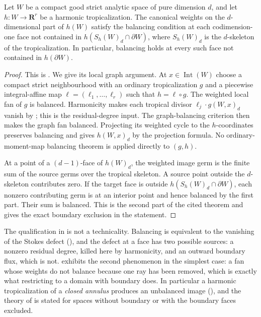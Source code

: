 \begin{theorem}\label{thm:harmonic-balancing}
Let $W$ be a compact good strict analytic space of pure dimension $d$,
and let $h:W\to\mathbf R^r$ be a harmonic tropicalization.  The canonical
weights on the $d$-dimensional part of $h(W)$ satisfy the balancing
condition at each codimension-one face not contained in
$h(S_h(W)_d\cap\partial W)$, where $S_h(W)_d$ is the $d$-skeleton of
the tropicalization.  In particular, balancing holds at every such face not
contained in $h(\partial W)$.
\end{theorem}
\begin{proof}
This is \cite[Theorem~9.7]{GJR26}.  We give its local graph argument.
At $x\in\operatorname{Int}(W)$ choose a compact strict neighbourhood
with an ordinary tropicalization $g$ and a piecewise integral-affine map
$\ell=(\ell_1,\ldots,\ell_r)$ such that $h=\ell\circ g$.
The weighted local fan of $g$ is balanced.  Harmonicity makes each
tropical divisor $\ell_j\cdot g(W,x)_d$ vanish by
\cite[Proposition~9.6]{GJR26}; this is the residual-degree input.
The graph-balancing criterion \cite[Corollary~9.4]{GJR26} then makes the
graph fan balanced.  Projecting its weighted cycle to the $h$-coordinates
preserves balancing and gives $h(W,x)_d$ by the projection formula.
No ordinary-moment-map balancing theorem is applied directly to $(g,h)$.

At a point of a $(d-1)$-face of $h(W)_d$, the weighted image germ is the
finite sum of the source germs over the tropical skeleton.  A source point
outside the $d$-skeleton contributes zero.  If the target face is outside
$h(S_h(W)_d\cap\partial W)$, each nonzero contributing germ is at an
interior point and hence balanced by the first part.  Their sum is balanced.
This is the second part of the cited theorem and gives the exact boundary
exclusion in the statement.
\end{proof}

\begin{remark}
\label{rem:ch18-balancing-boundary}
The qualification in  is not a technicality.
Balancing is equivalent to the vanishing of the Stokes defect
(), and the defect at a face has two
possible sources: a nonzero residual degree, killed here by harmonicity, and
an outward boundary flux, which is not.  
exhibits the second phenomenon in the simplest case: a fan whose weights do
not balance because one ray has been removed, which is exactly what
restricting to a domain with boundary does.  In particular a harmonic
tropicalization of a \emph{closed annulus} produces an unbalanced image
(), and the theory of  is
stated for spaces without boundary or with the boundary faces excluded.
\end{remark}

